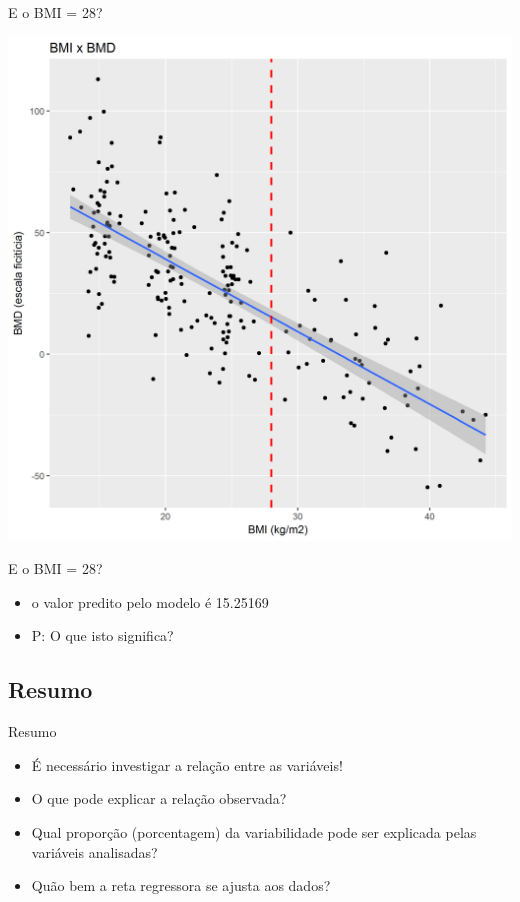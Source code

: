 \documentclass{beamer}
\begin{document}
\begin{frame}{E o BMI = 28?}
  \begin{center}
    \includegraphics[height=.9\textheight]{Cap18-19/pratica-plot3}
  \end{center}
\end{frame}

\begin{frame}{E o BMI = 28?}
  \begin{itemize}
  \item o valor predito pelo modelo é 15.25169
  \item P: O que isto significa?
  \end{itemize}
\end{frame}

\subsection{Resumo}

\begin{frame}{Resumo}
  \begin{itemize}
  \item É necessário investigar a relação entre as variáveis!
  \item O que pode explicar a relação observada?
  \item Qual proporção (porcentagem) da variabilidade pode ser
    explicada pelas variáveis analisadas?
  \item Quão bem a reta regressora se ajusta aos dados?
  \end{itemize}
\end{frame}
\end{document}

